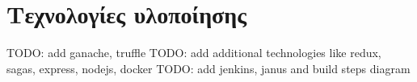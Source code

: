 \section{Τεχνολογίες υλοποίησης}

TODO: add ganache, truffle
TODO: add additional technologies like redux, sagas, express, nodejs, docker
TODO: add jenkins, janus and build steps diagram


